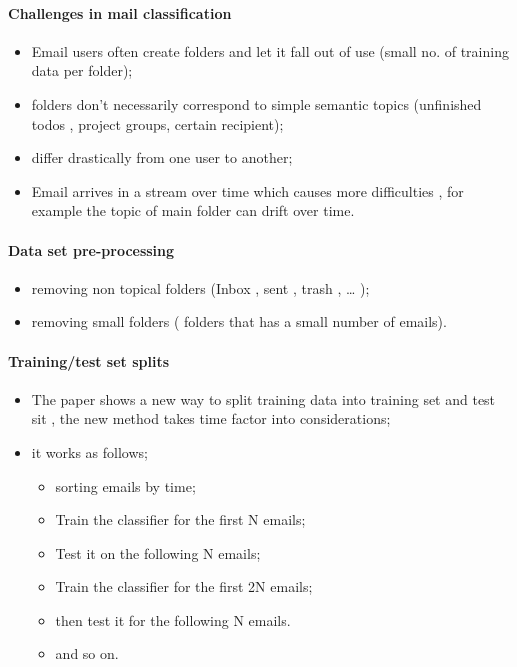 \documentclass[12pt]{article}
\begin{document}
\paragraph{Challenges in mail classification}
\begin{itemize}
  \item Email users often create folders and let it fall out of use (small no. of training data per folder);
  \item folders don’t necessarily correspond to simple semantic topics (unfinished todos , project groups, certain recipient);
  \item differ drastically from one user to another;
  \item Email arrives in a stream over time which causes more difficulties , for example the topic of main folder can drift over time.
\end{itemize}


\paragraph{Data set pre-processing}
\begin{itemize}
    \item removing non topical folders (Inbox , sent , trash , … );
    \item removing small folders ( folders that has a small number of emails).
\end{itemize}

\paragraph{Training/test set splits}
\begin{itemize}
    \item The paper shows a new way to split training data into training set and test sit , the new method takes time factor into considerations;
    \item it works as follows;
    \begin{itemize}
        \item sorting emails by time;
        \item Train the classifier for the first N emails;
        \item Test it on the following N emails;
        \item Train the classifier for the first 2N emails;
        \item then test it for the following N emails.
        \item and so on.
    \end{itemize}
\end{itemize}
\end{document}
